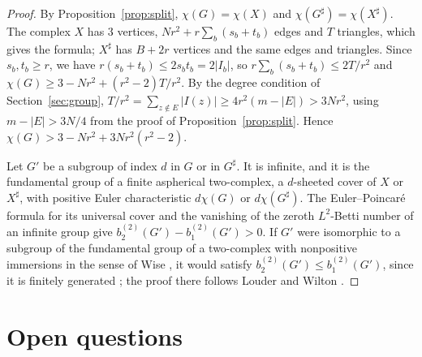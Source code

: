 \documentclass[11pt]{article}
\theoremstyle{definition}
\theoremstyle{remark}
\numberwithin{equation}{section}
\begin{document}
\begin{proof}
By Proposition~\ref{prop:split}, $\chi(G)=\chi(X)$ and $\chi(G^\sharp)=\chi(X^\sharp)$. The complex $X$ has $3$ vertices, $Nr^2+r\sum_b(s_b+t_b)$ edges and $T$ triangles, which gives the formula; $X^\sharp$ has $B+2r$ vertices and the same edges and triangles. Since $s_b,t_b\ge r$, we have $r(s_b+t_b)\le2s_bt_b=2|I_b|$, so $r\sum_b(s_b+t_b)\le2T/r^2$ and $\chi(G)\ge3-Nr^2+(r^2-2)T/r^2$. By the degree condition of Section~\ref{sec:group}, $T/r^2=\sum_{z\notin E}|I(z)|\ge4r^2(m-|E|)>3Nr^2$, using $m-|E|>3N/4$ from the proof of Proposition~\ref{prop:split}. Hence $\chi(G)>3-Nr^2+3Nr^2(r^2-2)$.

Let $G'$ be a subgroup of index $d$ in $G$ or in $G^\sharp$. It is infinite, and it is the fundamental group of a finite aspherical two-complex, a $d$-sheeted cover of $X$ or $X^\sharp$, with positive Euler characteristic $d\chi(G)$ or $d\chi(G^\sharp)$. The Euler--Poincar\'e formula for its universal cover and the vanishing of the zeroth $L^2$-Betti number of an infinite group \cite[Theorem~2.7(ix),(x)]{Lueck2003} give $b_2^{(2)}(G')-b_1^{(2)}(G')>0$. If $G'$ were isomorphic to a subgroup of the fundamental group of a two-complex with nonpositive immersions in the sense of Wise \cite{Wise2003}, it would satisfy $b_2^{(2)}(G')\le b_1^{(2)}(G')$, since it is finitely generated \cite[Proposition~2.9]{JZL2025}; the proof there follows Louder and Wilton \cite[Corollary~1.6]{LouderWilton2017}.
\end{proof}

\section{Open questions}\label{sec:questions}
\end{document}
